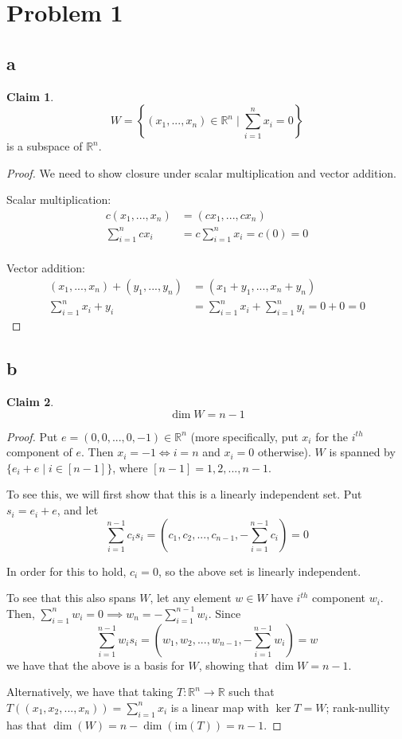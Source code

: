 \documentclass[12pt,letterpaper]{article}
\theoremstyle{definition}
\newtheorem*{claim}{Claim}
\newcommand{\R}{\mathbb{R}}
\newcommand{\im}{\mathrm{im}}
\begin{document}
\section*{Problem 1}
\subsection*{a}

\begin{claim}
  \[
    W = \left\{  (x_1, ..., x_n) \in \R^n \mid \sum_{i=1}^nx_i = 0 \right\}
  \]
  is a subspace of $\R^n$.
\end{claim}

\begin{proof}
  We need to show closure under scalar multiplication and vector addition.

  Scalar multiplication:
  \begin{align*}
    c(x_1, ..., x_n) &= (cx_1, ..., cx_n) \\
    \sum_{i=1}^ncx_i &= c\sum_{i=1}^nx_i = c(0) = 0 \\
  \end{align*}

  Vector addition:
  \begin{align*}
    (x_1, ..., x_n) + (y_1, ..., y_n) &= (x_1 + y_1, ..., x_n + y_n) \\
    \sum_{i=1}^nx_i + y_i &= \sum_{i=1}^nx_i + \sum_{i=1}^ny_i = 0 + 0 = 0
  \end{align*}
\end{proof}

\subsection*{b}

\begin{claim}
  \[
    \dim W = n - 1
  \]
\end{claim}

\begin{proof}
  Put $e = (0, 0, ..., 0, -1) \in \R^n$ (more specifically, put $x_i$ for the
  $i^{th}$ component of $e$. Then $x_i = -1 \iff i = n$ and $x_i = 0$
  otherwise). $W$ is spanned by $\{e_i + e \mid i \in [n-1]\}$, where $[n-1] =
  1, 2, ..., n-1$.

  To see this, we will first show that this is a linearly independent set. Put
  $s_i = e_i + e$, and let
  \[
    \sum_{i=1}^{n-1} c_is_i = (c_1, c_2, ..., c_{n-1}, -\sum_{i=1}^{n-1}c_i) = 0
  \]
  
  In order for this to hold, $c_i = 0$, so the above set is linearly
  independent.

  To see that this also spans $W$, let any element $w \in W$ have $i^{th}$
  component $w_i$. Then, $\sum_{i=1}^nw_i = 0 \implies w_n =
  -\sum_{i=1}^{n-1}w_i$. Since
  \[
    \sum_{i=1}^{n-1} w_is_i = (w_1, w_2, ..., w_{n-1}, -\sum_{i=1}^{n-1}w_i) = w
  \]
  we have that the above is a basis for $W$, showing that $\dim W = n - 1$.

  Alternatively, we have that taking $T: \R^n \rightarrow \R$ such that $T((x_1,
  x_2, ..., x_n)) = \sum_{i=1}^nx_i$ is a linear map with $\ker{T} = W$;
  rank-nullity has that $\dim(W) = n - \dim(\im(T)) = n - 1$.
\end{proof}
\end{document}
